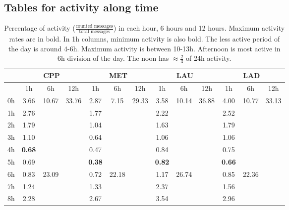 \documentclass[%
 aip,
 jmp,%
 amsmath,amssymb,
 reprint,%
]{revtex4-1}
\begin{document}
\clearpage

\subsection{Tables for activity along time}\label{tabTime}
\begin{table}
    \caption{Percentage of activity ($\frac{\text{counted messages}}{\text{total messages}}$) in each hour, 6 hours and 12 hours. Maximum activity rates are in bold. In 1h columns, minimum activity is also bold. The less active period of the day is around 4-6h. Maximum activity is between 10-13h. Afternoon is most active in 6h division of the day. The noon has $\approx \frac{2}{3}$ of 24h activity. }
\begin{center}
    \begin{tabular}{ |l|| c|c|c| c|c|c| c|c|c| c|c|c|}
        \hline
    & \multicolumn{3}{c|}{CPP} & \multicolumn{3}{c|}{MET} & \multicolumn{3}{c|}{LAU} & \multicolumn{3}{c|}{LAD}  \\ \hline
    & 1h   & 6h & 12h &   1h & 6h & 12h &   1h & 6h & 12h &   1h & 6h & 12h \\ \hline\hline
0h  & 3.66 & \multirow{6}{*}{10.67} & \multirow{12}{*}{33.76} & 2.87  & \multirow{6}{*}{7.15} & \multirow{12}{*}{29.33} & 3.58 & \multirow{6}{*}{10.14} &  \multirow{12}{*}{36.88} & 4.00 & \multirow{6}{*}{10.77} & \multirow{12}{*}{33.13} \\
1h  & 2.76 &                        &                         & 1.77  & & &  2.22 & & & 2.52 & & \\
2h  & 1.79 &                        &                         & 1.04  & & & 1.63 & & & 1.79 & & \\
3h  & 1.10 &                        &                         & 0.64  & & & 1.06 & & & 1.06 & & \\
4h  & {\bf 0.68} &                        &                         & 0.47  & & &  0.84 & & & 0.75 & & \\
5h  & 0.69 &                        &                         & {\bf 0.38}  & & & {\bf 0.82} & & & {\bf 0.66} & & \\\cline{3-3}\cline{6-6}\cline{9-9}\cline{12-12}
6h  & 0.83 & \multirow{6}{*}{23.09} &                         & 0.72  & \multirow{6}{*}{22.18} & & 1.17 & \multirow{6}{*}{26.74} & & 0.85 & \multirow{6}{*}{22.36} &  \\
7h  & 1.24 &                        &                         & 1.33  & & & 2.37 & & & 1.56 & & \\
8h  & 2.28 &                        &                         & 2.67  & & & 3.54 & & & 2.96 & & \\

\end{tabular}
\end{center}
\end{table}
\end{document}
